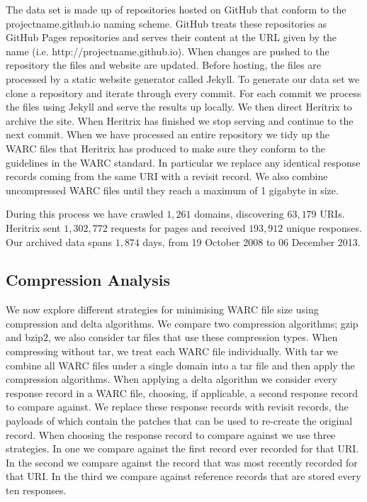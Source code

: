 \documentclass[11pt, twocolumn]{article}
\def \domainscrawled {1,261}
\def \uniqueuris {63,179}
\def \requestssent {1,302,772}
\def \uniqueresponses {193,912}
\def \oldestpage {19 October 2008}
\def \youngestpage {06 December 2013}
\def \totaldays {1,874}
\begin{document}
    The data set is made up of repositories hosted on GitHub that conform to the projectname.github.io naming scheme. GitHub treats these repositories as GitHub Pages repositories and serves their content at the URL given by the name (i.e. http://projectname.github.io). When changes are pushed to the repository the files and website are updated. Before hosting, the files are processed by a static website generator called Jekyll\footnotemark. To generate our data set we clone a repository and iterate through every commit. For each commit we process the files using Jekyll and serve the results up locally. We then direct Heritrix to archive the site. When Heritrix has finished we stop serving and continue to the next commit. When we have processed an entire repository we tidy up the WARC files that Heritrix has produced to make sure they conform to the guidelines in the WARC standard. In particular we replace any identical response records coming from the same URI with a revisit record. We also combine uncompressed WARC files until they reach a maximum of 1 gigabyte in size.

    During this process we have crawled $\domainscrawled$ domains, discovering $\uniqueuris$ URIs. Heritrix sent $\requestssent$ requests for pages and received $\uniqueresponses$ unique responses. Our archived data spans $\totaldays$ days, from \oldestpage{} to \youngestpage.



  \subsection{Compression Analysis}

    We now explore different strategies for minimising WARC file size using compression and delta algorithms. We compare two compression algorithms; gzip and bzip2, we also consider tar files that use these compression types. When compressing without tar, we treat each WARC file individually. With tar we combine all WARC files under a single domain into a tar file and then apply the compression algorithms. When applying a delta algorithm we consider every response record in a WARC file, choosing, if applicable, a second response record to compare against. We replace these response records with revisit records, the payloads of which contain the patches that can be used to re-create the original record. When choosing the response record to compare against we use three strategies. In one we compare against the first record ever recorded for that URI. In the second we compare against the record that was most recently recorded for that URI. In the third we compare against reference records that are stored every ten responses.
\end{document}
